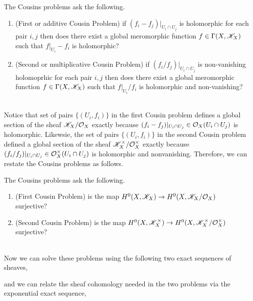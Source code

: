 \documentclass[12pt]{article}
\begin{document}
\begin{defn}
The Cousins problems ask the following. 
\begin{enumerate}
\item (First or additive Cousin Problem) if $(f_i - f_j)|_{U_i \cap U_j}$ is holomorphic for each pair $i,j$ then does there exist a global meromorphic function $f \in \Gamma(X, \mathscr{K}_X)$ such that $f|_{U_i} - f_i$ is holomorphic?
\item (Second or multiplicative Cousin Problem) if $(f_i / f_j)|_{U_i \cap U_j}$ is non-vanishing holomoprhic for each pair $i,j$ then does there exist a global meromorphic function $f \in \Gamma(X, \mathscr{K}_X)$ such that $f|_{U_i} / f_i$ is holomorphic and non-vanishing?
\end{enumerate}
\end{defn}
\noindent\\
Notice that set of pairs $\{ (U_i, f_i) \}$ in the first Cousin problem defines a global section of the sheaf $\mathscr{K}_X / \mathcal{O}_{X}$ exactly because $(f_i - f_j)|_{U_i \cap U_j} \in \mathcal{O}_{X}(U_i \cap U_j)$ is holomorphic. Likewsie, the set of pairs $\{ (U_i, f_i) \}$ in the second Cousin problem defined a global section of the sheaf $\mathscr{K}_X^\times / \mathcal{O}_{X}^\times$ exactly because $(f_i / f_j) |_{U_i \cap U_j} \in \mathcal{O}_{X}^\times(U_i \cap U_j)$ is holomorphic and nonvanishing. Therefore, we can restate the Cousins problems as follows.

\begin{defn}
The Cousins problems ask the following. 
\begin{enumerate}
\item (First Cousin Problem) is the map $H^0(X, \mathscr{K}_X) \to H^0(X, \mathscr{K}_X / \mathcal{O}_{X})$ surjective?
\item (Second Cousin Problem) is the map $H^0(X, \mathscr{K}_X^\times) \to H^0(X, \mathscr{K}_X^\times / \mathcal{O}_{X}^\times)$ surjective?
\end{enumerate}
\end{defn}
\noindent\\
Now we can solve these problems using the following two exact sequences of sheaves,
\begin{center}
\end{center}
and we can relate the sheaf cohomology needed in the two problems via the exponential exact sequence,
\begin{center}
\end{center}
\end{document}
